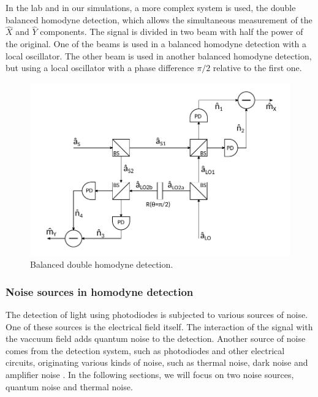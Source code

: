 %
In the lab and in our simulations, a more complex system is used, the double balanced homodyne detection, which allows the simultaneous measurement of the $\hat{X}$ and $\hat{Y}$ components. The signal is divided in two beam with half the power of the original. One of the beams is used in a balanced homodyne detection with a local oscillator. The other beam is used in another balanced homodyne detection, but using a local oscillator with a phase difference $\pi/2$ relative to the first one.
%
\begin{figure}[H]
	\label{fig:scheme_homodyne}
	\centering
	\includegraphics{./sdf/quantum_noise/figures/scheme_double_homodyne.pdf}
	\caption{Balanced double homodyne detection.}
\end{figure}
%
%
%
\subsubsection{Noise sources in homodyne detection}
The detection of light using photodiodes is subjected to various sources of noise. One of these sources is the electrical field itself. The interaction of the signal with the vaccuum field adds quantum noise to the detection.
Another source of noise comes from the detection system, such as photodiodes and other electrical circuits, originating various kinds of noise, such as thermal noise, dark noise and amplifier noise
\cite{hans2004}.
In the following sections, we will focus on two noise sources, quantum noise and thermal noise.
%
%
%
